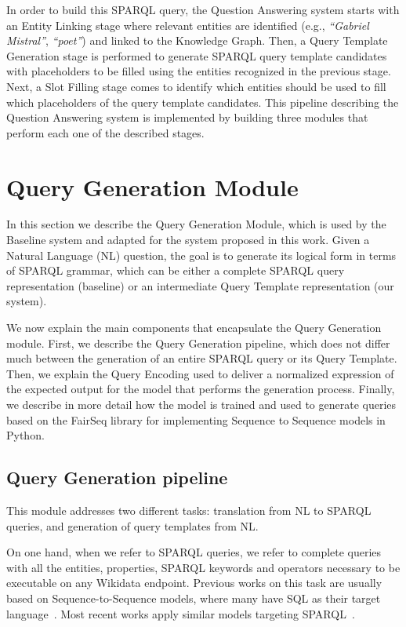 In order to build this SPARQL query, the Question Answering system starts with an Entity 
Linking stage where relevant entities are identified (e.g., \textit{“Gabriel Mistral”}, 
\textit{“poet”}) and linked to the Knowledge Graph. Then, a Query Template Generation stage 
is performed to generate SPARQL query template candidates with placeholders to be filled 
using the entities recognized in the previous stage. Next, a Slot Filling stage comes to 
identify which entities should be used to fill which placeholders of the query template 
candidates. This pipeline describing the Question Answering system is implemented by building 
three modules that perform each one of the described stages. 

\section{Query Generation Module}
\label{cap3:system/queryGenModule}
In this section we describe the Query Generation Module, which is used by the Baseline system 
and adapted for the system proposed in this work. Given a Natural Language (NL) question, the 
goal is to generate its logical form in terms of SPARQL grammar, which can be either a 
complete SPARQL query representation (baseline) or an intermediate Query Template 
representation (our system). 

We now explain the main components that encapsulate the Query Generation module. First, we 
describe the Query Generation pipeline, which does not differ much between the generation of 
an entire SPARQL query or its Query Template. Then, we explain the Query Encoding used to 
deliver a normalized expression of the expected output for the model that performs the 
generation process. Finally, we describe in more detail how the model is trained and used to 
generate queries based on the FairSeq library for implementing Sequence to Sequence models in 
Python.

\subsection{Query Generation pipeline}
\label{cap3:system/queryGenModule/pipeline}
This module addresses two different tasks: translation from NL to SPARQL queries, and 
generation of query templates from NL. 

On one hand, when we refer to SPARQL queries, we refer to complete queries with all the 
entities, properties, SPARQL keywords and operators necessary to be executable on any 
Wikidata endpoint. Previous works on this task are usually based on Sequence-to-Sequence 
models, where many have SQL as their target language~\cite{nmt:DongL16, nmt:CaiXZYLL18, 
nmt:ZhongCoRR17}. Most recent works apply similar models targeting SPARQL~\cite{nmt:CoRRLuz18, 
nmt:nspm-SoruMMPVEN17, nmt:CoRRSoru18}.

